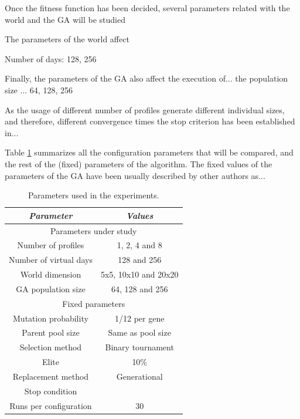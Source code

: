 \documentclass[runningheads,a4paper]{llncs}
\begin{document}
Once the fitness function has been decided, several parameters related with the world and the GA will be studied

The parameters of the world affect  %


Number of days: 128, 256


Finally, the parameters of the GA also affect the execution of... the
population size ... 64, 128, 256 %

As the usage of different number of profiles generate different
individual sizes, and therefore, different convergence times the stop
criterion has been established in... %

Table \ref{tab:parameters} summarizes all the configuration parameters that will be compared, and the rest of the (fixed) parameters of the algorithm. The fixed values of the parameters of the GA have been usually described by other authors as...

\begin{table}
\begin{center}
\begin{tabular}{|c|c|}
\hline
{\em Parameter} & {\em Values} \\\hline \hline
\multicolumn{2}{c}{Parameters under study} \\ \hline \hline
Number of profiles & 1, 2, 4 and 8 \\\hline
Number of virtual days &  128 and 256 \\ \hline
World dimension &  5x5, 10x10 and 20x20 \\ \hline
GA population size & 64, 128 and 256 \\ \hline
\multicolumn{2}{c}{Fixed parameters} \\ \hline \hline
Mutation probability & 1/12 per gene \\ \hline
Parent pool size & Same as pool size \\ \hline
Selection method & Binary tournament \\ \hline 
Elite & 10\%  \\ \hline
Replacement method & Generational\\ \hline
Stop condition & \\ \hline %
Runs per configuration & 30 \\ \hline
\end{tabular}
\caption{Parameters used in the experiments.}
\label{tab:parameters}
\end{center}
\end{table}
\end{document}
